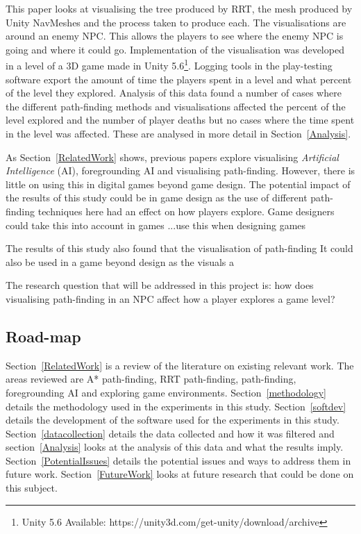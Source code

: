 \documentclass[journal]{IEEEtran}
\begin{document}
	This paper looks at visualising the tree produced by RRT, the mesh produced by Unity NavMeshes and the process taken to produce each. The visualisations are around an enemy NPC. This allows the players to see where the enemy NPC is going and where it could go.      
	Implementation of the visualisation was developed in a level of a 3D game made in Unity 5.6\footnote[1]{Unity 5.6 Available: https://unity3d.com/get-unity/download/archive}. Logging tools in the play-testing software export the amount of time the players spent in a level and what percent of the level they explored. Analysis of this data found a number of cases where the different path-finding methods and visualisations affected the percent of the level explored and the number of player deaths but no cases where the time spent in the level was affected. These are analysed in more detail in Section~\ref{Analysis}.
	
	As Section~\ref{RelatedWork} shows, previous papers explore visualising \textit{Artificial Intelligence} (AI), foregrounding AI and visualising path-finding. However, there is little on using this in digital games beyond game design. The potential impact of the results of this study could be in game design as the use of different path-finding techniques here had an effect on how players explore. Game designers could take this into account in games ...use this when designing games
	
	The results of this study also found that the visualisation of path-finding It could also be used in a game beyond design as the visuals a
	
	The research question that will be addressed in this project is: how does visualising path-finding in an NPC affect how a player explores a game level?
	
	
	\subsection{Road-map}
	Section~\ref{RelatedWork} is a review of the literature on existing relevant work. The areas reviewed are A* path-finding, RRT path-finding, path-finding, foregrounding AI and exploring game environments. 
	Section~\ref{methodology} details the methodology used in the experiments in this study. Section~\ref{softdev} details the development of the software used for the experiments in this study.
	Section~\ref{datacollection} details the data collected and how it was filtered and section~\ref{Analysis} looks at the analysis of this data and what the results imply. Section~\ref{PotentialIssues} details the potential issues and ways to address them in future work. Section~\ref{FutureWork} looks at future research that could be done on this subject. 
	
\end{document}
